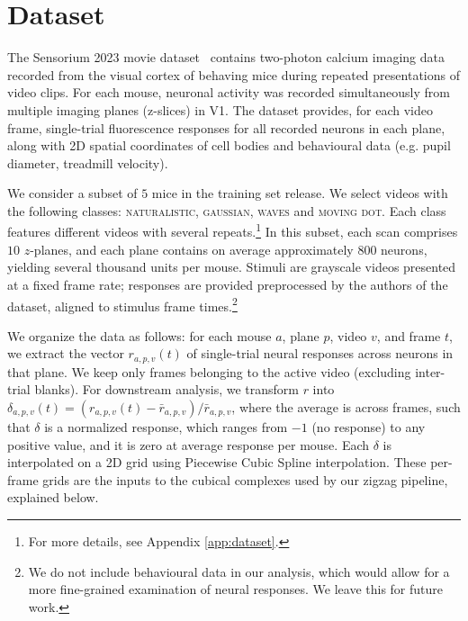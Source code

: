 \documentclass[11pt]{article}
\begin{document}
\section{Dataset}\label{sec:dataset}

The Sensorium 2023 movie dataset~\cite{sensorium2023} contains two-photon calcium imaging data recorded from the visual cortex of behaving mice during repeated presentations of video clips. For each mouse, neuronal activity was recorded simultaneously from multiple imaging planes (z-slices) in V1. The dataset provides, for each video frame, single-trial fluorescence responses for all recorded neurons in each plane, along with 2D spatial coordinates of cell bodies and behavioural data (e.g. pupil diameter, treadmill velocity).

We consider a subset of $5$ mice in the training set release. We select videos with the following classes: \textsc{naturalistic}, \textsc{gaussian}, \textsc{waves} and \textsc{moving dot}. Each class features different videos with several repeats.\footnote{For more details, see Appendix \ref{app:dataset}.}
 In this subset, each scan comprises $10$ $z$-planes, and each plane contains on average approximately $800$ neurons, yielding several thousand units per mouse. Stimuli are grayscale videos presented at a fixed frame rate; responses are provided preprocessed by the authors of the dataset, aligned to stimulus frame times.\footnote{We do not include behavioural data in our analysis, which would allow for a more fine-grained examination of neural responses. We leave this for future work.}

We organize the data as follows: for each mouse $a$, plane $p$, video $v$, and frame $t$, we extract the vector $r_{a,p,v}(t)$ of single-trial neural responses across neurons in that plane. We keep only frames belonging to the active video (excluding inter-trial blanks). For downstream analysis, we transform $r$ into $\delta_{a,p,v}(t) = (r_{a,p,v}(t) - \bar{r}_{a,p,v})/\bar{r}_{a,p,v}$,
where the average is across frames, such that $\delta$ is a normalized response, which ranges from $-1$ (no response) to any positive value, and it is zero at average response per mouse. Each $\delta$ is interpolated on a 2D grid using Piecewise Cubic Spline interpolation. These per-frame grids are the inputs to the cubical complexes used by our zigzag pipeline, explained below.
\end{document}
